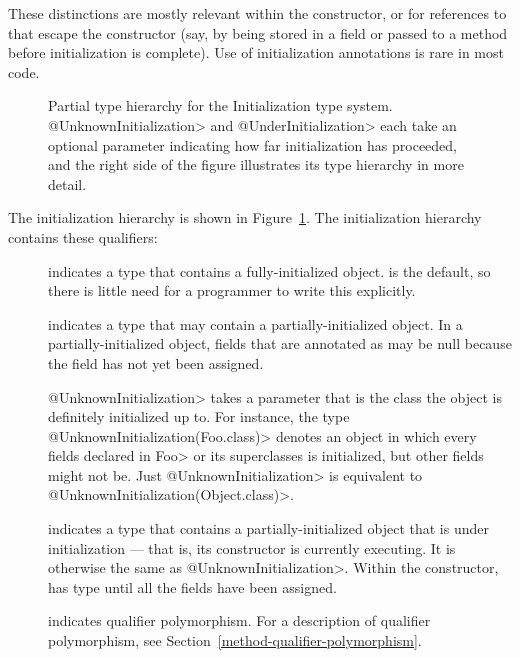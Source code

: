 These distinctions are mostly relevant within the constructor, or for
references to  that escape the constructor (say, by being stored
in a field or passed to a method before initialization is complete).
Use of initialization annotations is rare in most code.



\begin{figure}
\caption{Partial type hierarchy for the Initialization type system.
  \<@UnknownInitialization> and \<@UnderInitialization> each take an
  optional parameter indicating how far initialization has proceeded, and
  the right side of the figure illustrates its type hierarchy in more detail.}
\label{fig-initialization-hierarchy}
\end{figure}

The initialization hierarchy is shown in Figure~\ref{fig-initialization-hierarchy}.
The initialization hierarchy contains these qualifiers:

\begin{description}

\item[]
  indicates a type that contains a fully-initialized object.  
  is the default, so there is little need for a programmer to write this
  explicitly.

\item[]
  indicates a type that may contain a partially-initialized object.  In a
  partially-initialized object, fields that are annotated as
   may be null because the field
  has not yet been assigned.

  \<@UnknownInitialization> takes a parameter that is the class the object
  is definitely initialized up to.  For instance, the type
  \<@UnknownInitialization(Foo.class)> denotes an object in which every
  fields declared in \<Foo> or its superclasses is initialized, but other
  fields might not be.
  Just \<@UnknownInitialization> is equivalent to
  \<@UnknownInitialization(Object.class)>.

\item[]
  indicates a type that contains a partially-initialized object that is
  under initialization --- that is, its constructor is currently executing.
  It is otherwise the same as \<@UnknownInitialization>.  Within the
  constructor,  has
   type until
  all the  fields have been assigned.

\item[]
indicates qualifier polymorphism.
For a description of qualifier polymorphism, see
Section~\ref{method-qualifier-polymorphism}.

\end{description}

